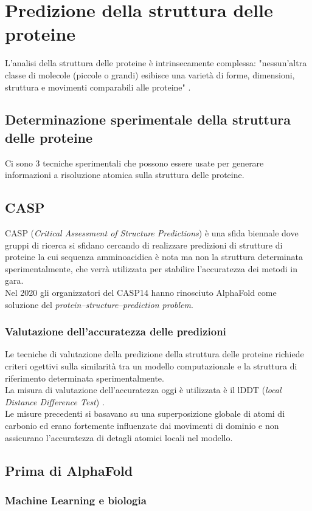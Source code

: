 \chapter{Predizione della struttura delle proteine}
L'analisi della struttura delle proteine è intrinsecamente complessa: "nessun'altra classe di molecole (piccole o grandi) esibisce una varietà di forme, dimensioni, struttura e movimenti comparabili alle proteine"  \parencite{baxevanis2020bioinformatics}.

\section{Determinazione sperimentale della struttura delle proteine}

Ci sono 3 tecniche sperimentali che possono essere usate per generare informazioni a risoluzione atomica sulla struttura delle proteine.

\section{CASP}
CASP (\textit{Critical Assessment of Structure Predictions}) è una sfida biennale dove gruppi di ricerca si sfidano cercando di realizzare predizioni di strutture di proteine la cui sequenza amminoacidica è nota ma non la struttura determinata sperimentalmente, che verrà utilizzata per stabilire l'accuratezza dei metodi in gara. \\

Nel 2020 gli organizzatori del CASP14 hanno rinosciuto AlphaFold come soluzione del \textit{protein–structure–prediction problem}. \\

\subsection{Valutazione dell'accuratezza delle predizioni}

Le tecniche di valutazione della predizione della struttura delle proteine richiede criteri ogettivi sulla similarità tra un modello computazionale e la struttura di riferimento determinata sperimentalmente.\\

La misura di valutazione dell'accuratezza oggi è utilizzata è il lDDT (\textit{local Distance
Difference Test}) \cite{mariani2013lddt}. \\

Le misure precedenti si basavano su una superposizione globale di atomi di carbonio ed erano fortemente influenzate dai movimenti di dominio e non assicurano l'accuratezza di detagli atomici locali nel modello.

\section{Prima di AlphaFold}

\subsection{Machine Learning e biologia}

\clearpage
